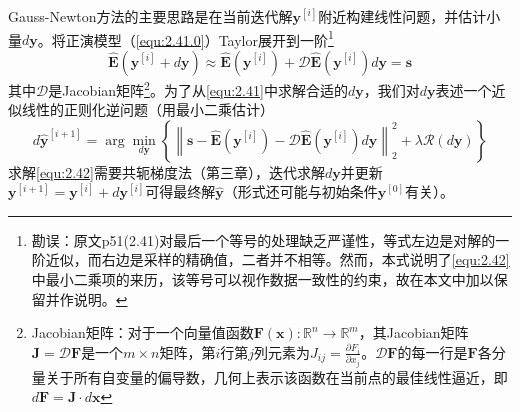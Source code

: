 \documentclass[12pt]{article}
\begin{document}
Gauss-Newton方法的主要思路是在当前迭代解$\bm{y}^{[i]}$附近构建线性问题，并估计小量$d\bm{y}$。将正演模型（\autoref{equ:2.41.0}）Taylor展开到一阶\footnote{勘误：原文p51(2.41)对最后一个等号的处理缺乏严谨性，等式左边是对解的一阶近似，而右边是采样的精确值，二者并不相等。然而，本式说明了\autoref{equ:2.42}中最小二乘项的来历，该等号可以视作数据一致性的约束，故在本文中加以保留并作说明。}
\begin{equation}
    \widehat{\bm{E}}\left(\bm{y}^{[i]}+d\bm{y}\right)\approx\widehat{\bm{E}}\left(\bm{y}^{[i]}\right)+\mathcal{D}\widehat{\bm{E}}\left(\bm{y}^{[i]}\right)d\bm{y}=\bm{s}
    \label{equ:2.41}
\end{equation}
其中$\mathcal{D}$是Jacobian矩阵\footnote{Jacobian矩阵：对于一个向量值函数$\bm{F}(\bm{x}):\mathbb{R}^n\to\mathbb{R}^m$，其Jacobian矩阵$\mathbf{J}=\mathcal{D}\bm{F}$是一个$m\times n$矩阵，第$i$行第$j$列元素为$J_{ij}=\frac{\partial F_i}{\partial x_j}$。$\mathcal{D}\bm{F}$的每一行是$\bm{F}$各分量关于所有自变量的偏导数，几何上表示该函数在当前点的最佳线性逼近，即$d\bm{F}=\mathbf{J}\cdot d\bm{x}$}。为了从\autoref{equ:2.41}中求解合适的$d\bm{y}$，我们对$d\bm{y}$表述一个近似线性的正则化逆问题（用最小二乘估计）
\begin{equation}
    d\hat{\bm{y}}^{[i+1]}=\arg\min_{d\bm{y}}\left\{\left\|\bm{s}-\widehat{\bm{E}}\left(\bm{y}^{[i]}\right)-\mathcal{D}\widehat{\bm{E}}\left(\bm{y}^{[i]}\right)d\bm{y}\right\|_2^2+\lambda\mathcal{R}(d\bm{y})\right\}
    \label{equ:2.42}
\end{equation}
求解\autoref{equ:2.42}需要共轭梯度法（第三章），迭代求解$d\bm{y}$并更新$\bm{y}^{[i+1]}=\bm{y}^{[i]}+d\bm{y}^{[i]}$可得最终解$\hat{\bm{y}}$（形式还可能与初始条件$\bm{y}^{[0]}$有关）。
\end{document}
